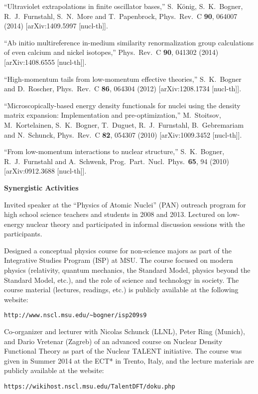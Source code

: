 \begin{numberedlist}

\item
``Ultraviolet extrapolations in finite oscillator bases,''
S.~K\"onig, S.~K.~Bogner, R.~J.~Furnstahl, S.~N.~More and T.~Papenbrock,
Phys.\ Rev.\ C {\bf 90}, 064007 (2014)
[arXiv:1409.5997 [nucl-th]].  
\item
``Ab initio multireference in-medium similarity renormalization group calculations of even calcium and nickel isotopes,''
Phys.\ Rev.\ C {\bf 90}, 041302 (2014)
[arXiv:1408.6555 [nucl-th]].
\item 
``High-momentum tails from low-momentum effective theories,''
  S.~K.~Bogner and D.~Roscher,
  Phys.\ Rev.\ C {\bf 86}, 064304 (2012)
  [arXiv:1208.1734 [nucl-th]].
\item
  ``Microscopically-based energy density functionals for nuclei using the density matrix expansion: Implementation and pre-optimization,''
  M.~Stoitsov, M.~Kortelainen, S.~K.~Bogner, T.~Duguet, R.~J.~Furnstahl, B.~Gebremariam and N.~Schunck,
   Phys.\ Rev.\ C {\bf 82}, 054307 (2010)
  [arXiv:1009.3452 [nucl-th]].
\item
 ``From low-momentum interactions to nuclear structure,''
  S.~K.~Bogner, R.~J.~Furnstahl and A.~Schwenk,
  Prog.\ Part.\ Nucl.\ Phys.\  {\bf 65}, 94 (2010)
  [arXiv:0912.3688 [nucl-th]].



  
\end{numberedlist}

\noindent
{\bf Synergistic Activities}
\vspace*{-8pt}

\begin{numberedlist}
 \item Invited speaker at the ``Physics of Atomic Nuclei'' (PAN) outreach program for high school science teachers and students in 2008 and 2013. Lectured on low-energy nuclear theory and participated in informal discussion sessions with the participants.
 \item Designed a conceptual physics course for non-science majors as part of the Integrative Studies Program (ISP) at MSU. The course focused on modern physics (relativity, quantum mechanics, the Standard Model, physics beyond the Standard Model, etc.), and the role of science and technology in society. The course material (lectures, readings, etc.) is publicly available at the following website:
 
 \verb+http://www.nscl.msu.edu/~bogner/isp209s9+
 \item Co-organizer and lecturer with Nicolas Schunck (LLNL), Peter Ring (Munich), and Dario Vretenar (Zagreb) of an advanced course on Nuclear Density Functional Theory as part of the Nuclear TALENT initiative. The course was given in Summer 2014 at the ECT* in Trento, Italy, and the lecture materials are publicly available at the website:
 
 \verb+https://wikihost.nscl.msu.edu/TalentDFT/doku.php+

 
\end{numberedlist}

